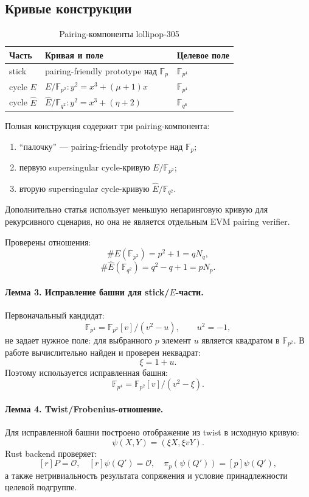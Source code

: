 \documentclass[12pt,a4paper]{article}
\newcommand{\Fp}{\mathbb{F}_p}
\begin{document}
\subsection{Кривые конструкции}

\begin{table}[htbp]
\centering
\caption{Pairing-компоненты lollipop-305}
\small
\begin{tabularx}{\linewidth}{l Y Y}
\toprule
Часть & Кривая и поле & Целевое поле \\
\midrule
stick & pairing-friendly prototype над $\Fp$ & $\mathbb{F}_{p^4}$ \\
cycle $E$ & $E/\mathbb{F}_{p^2}: y^2=x^3+(\mu+1)x$ & $\mathbb{F}_{p^4}$ \\
cycle $\widehat{E}$ &
$\widehat{E}/\mathbb{F}_{q^2}: y^2=x^3+(\eta+2)$ &
$\mathbb{F}_{q^6}$ \\
\bottomrule
\end{tabularx}
\end{table}

Полная конструкция содержит три pairing-компонента:
\begin{enumerate}
    \item ``палочку'' --- pairing-friendly prototype над $\Fp$;
    \item первую supersingular cycle-кривую $E/\mathbb{F}_{p^2}$;
    \item вторую supersingular cycle-кривую
    $\widehat{E}/\mathbb{F}_{q^2}$.
\end{enumerate}
Дополнительно статья использует меньшую непаринговую кривую для рекурсивного
сценария, но она не является отдельным EVM pairing verifier.

Проверены отношения:
\[
    \#E(\mathbb{F}_{p^2})=p^2+1=qN_q,
\]
\[
    \#\widehat{E}(\mathbb{F}_{q^2})=q^2-q+1=pN_p.
\]

\paragraph{Лемма 3. Исправление башни для stick/$E$-части.}
Первоначальный кандидат:
\[
    \mathbb{F}_{p^4}
    =
    \mathbb{F}_{p^2}[v]/(v^2-u),
    \qquad u^2=-1,
\]
не задает нужное поле: для выбранного $p$ элемент $u$ является квадратом в
$\mathbb{F}_{p^2}$. В работе вычислительно найден и проверен неквадрат:
\[
    \xi=1+u.
\]
Поэтому используется исправленная башня:
\[
    \mathbb{F}_{p^4}
    =
    \mathbb{F}_{p^2}[v]/(v^2-\xi).
\]

\paragraph{Лемма 4. Twist/Frobenius-отношение.}
Для исправленной башни построено отображение из twist в исходную кривую:
\[
    \psi(X,Y)=(\xi X,\xi vY).
\]
Rust backend проверяет:
\[
    [r]P=\mathcal O,\quad
    [r]\psi(Q')=\mathcal O,\quad
    \pi_p(\psi(Q'))=[p]\psi(Q'),
\]
а также нетривиальность результата сопряжения и условие принадлежности
целевой подгруппе.
\end{document}
